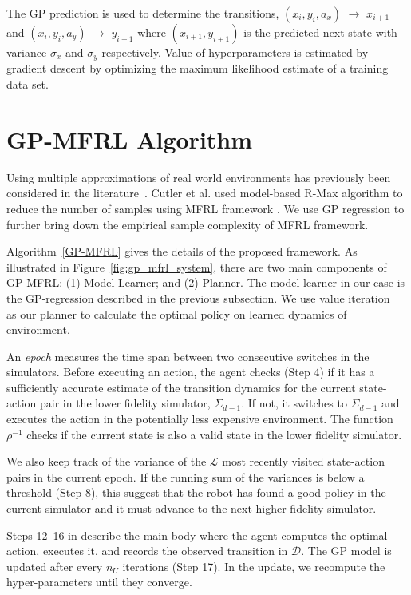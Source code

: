 \documentclass[12pt]{report}
\begin{document}
The GP prediction is used to determine the transitions, $(x_i,y_i,a_x)$ $\rightarrow$ $x_{i+1}$ and $(x_i,y_i,a_y)$ $\rightarrow$ $y_{i+1}$ where $(x_{i+1},y_{i+1})$ is the predicted next state with variance $\sigma_x$ and $\sigma_y$ respectively. Value of hyperparameters is estimated by gradient descent by optimizing the maximum likelihood estimate of a training data set. 


\section{GP-MFRL Algorithm}

Using multiple approximations of real world environments has previously been considered in the literature~\cite{abbeel2006using,taylor2007transfer}. Cutler et al. used model-based R-Max algorithm to reduce the number of samples using MFRL framework \cite{cutler2014reinforcement}. We use GP regression to further bring down the empirical sample complexity of MFRL framework. 


Algorithm~\ref{GP-MFRL} gives the details of the proposed framework. As illustrated in Figure~\ref{fig:gp_mfrl_system}, there are two main components of GP-MFRL: (1) Model Learner; and (2) Planner. The model learner in our case is the GP-regression described in the previous subsection. We use value iteration~\cite{sutton1998reinforcement} as our planner to calculate the optimal policy on learned dynamics of environment. 

An \emph{epoch} measures the time span between two consecutive switches in the simulators. Before executing an action, the agent checks (Step 4) if it has a sufficiently accurate estimate of the transition dynamics for the current state-action pair in the lower fidelity simulator, $\Sigma_{d-1}$. If not, it switches to $\Sigma_{d-1}$ and executes the action in the potentially less expensive environment. The function $\rho^{-1}$ checks if the current state is also a valid state in the lower fidelity simulator. 

We also keep track of the variance of the $\mathcal{L}$ most recently visited state-action pairs in the current epoch. If the running sum of the variances is below a threshold (Step 8), this suggest that the robot has found a good policy in the current simulator and it must advance to the next higher fidelity simulator.

Steps 12--16 in describe the main body where the agent computes the optimal action, executes it, and records the observed transition in $\mathcal{D}$. The GP model is updated after every $n_U$ iterations (Step 17). In the update, we recompute the hyper-parameters until they converge.
\end{document}
